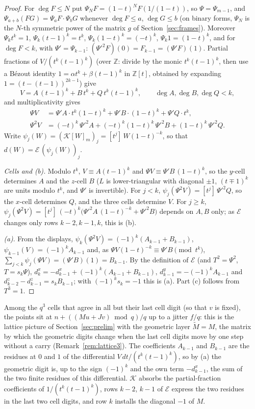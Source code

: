 \documentclass[11pt]{amsart}
\theoremstyle{definition}
\theoremstyle{plain}
\newcommand{\Z}{\mathbb{Z}}
\newcommand{\coef}[1]{[t^{#1}]\,}
\begin{document}
\begin{proof}
For $\deg F\le N$ put $\Psi_NF=(1-t)^NF(1/(1-t))$, so $\Psi=\Psi_{m-1}$, and $\Psi_{a+b}(FG)=\Psi_aF\cdot\Psi_bG$ whenever $\deg F\le a$, $\deg G\le b$ (on binary forms, $\Psi_N$ is the $N$-th symmetric power of the matrix $g$ of Section~\ref{sec:frames}). Moreover $\Psi_kt^k=1$, $\Psi_k(t-1)^k=t^k$, $\Psi_k(1-t)^k=(-t)^k$, $\Psi_k1=(1-t)^k$, and for $\deg F<k$, with $\Psi'=\Psi_{k-1}$: $(\Psi'^2F)(0)=F_{k-1}=(\Psi'F)(1)$. Partial fractions of $V/(t^k(t-1)^k)$ (over $\Z$: divide by the monic $t^k(t-1)^k$, then use a B\'ezout identity $1=\alpha t^k+\beta(t-1)^k$ in $\Z[t]$, obtained by expanding $1=(t-(t-1))^{2k-1}$) give
\[
V=A\,(t-1)^k+B\,t^k+Q\,t^k(t-1)^k,\qquad\deg A,\deg B,\deg Q<k,
\]
and multiplicativity gives
\begin{align*}
\Psi V&=\Psi'A\cdot t^k(1-t)^k+\Psi'B\cdot(1-t)^k+\Psi'Q\cdot t^k,\\
\Psi^2V&=(-t)^k\,\Psi'^2A+(-t)^k(1-t)^k\,\Psi'^2B+(1-t)^k\,\Psi'^2Q .
\end{align*}
Write $\psi_j(W)=(\mathcal K[W]_m)_j=\coef{j}W(1-t)^{-k}$, so that $d(W)=\mathcal E\,(\psi_j(W))_j$.

\emph{Cells and (b).} Modulo $t^k$, $V\equiv A(t-1)^k$ and $\Psi V\equiv\Psi'B\,(1-t)^k$, so the $y$-cell determines $A$ and the $z$-cell $B$ ($L$ is lower-triangular with diagonal $\pm1$, $(t\mp1)^k$ are units modulo $t^k$, and $\Psi'$ is invertible). For $j<k$, $\psi_j(\Psi^2V)=\coef{j}\Psi'^2Q$, so the $x$-cell determines $Q$, and the three cells determine $V$. For $j\ge k$, $\psi_j(\Psi^2V)=\coef{j}(-t)^k\bigl(\Psi'^2A\,(1-t)^{-k}+\Psi'^2B\bigr)$ depends on $A,B$ only; as $\mathcal E$ changes only rows $k-2,k-1,k$, this is (b).

\emph{(a).} From the displays, $\psi_k(\Psi^2V)=(-1)^k(A_{k-1}+B_{k-1})$, $\psi_{k-1}(V)=(-1)^kA_{k-1}$ and, as $\Psi V(1-t)^{-k}\equiv\Psi'B\pmod{t^k}$, $\sum_{j<k}\psi_j(\Psi V)=(\Psi'B)(1)=B_{k-1}$. By the definition of $\mathcal E$ (and $T^2=\Psi^2$, $T=s_k\Psi$), $d^x_k=-d^x_{k-1}+(-1)^k(A_{k-1}+B_{k-1})$, $d^y_{k-1}=-(-1)^kA_{k-1}$ and $d^z_{k-2}-d^z_{k-1}=s_kB_{k-1}$; with $(-1)^ks_k=-1$ this is (a). Part (c) follows from $T^3=1$.
\end{proof}

Among the $q^3$ cells that agree in all but their last cell digit (so that $v$ is fixed), the points sit at $n+((Mu+Jv)\bmod q)/q$ up to a jitter $f/q$: this is the lattice picture of Section~\ref{sec:prelim} with the geometric layer $\tilde M=M$, the matrix by which the geometric digits change when the last cell digits move by one step without a carry (Remark~\ref{rem:lattice3}). The coefficients $A_{k-1}$ and $B_{k-1}$ are the residues at $0$ and $1$ of the differential $V\,dt/(t^k(t-1)^k)$, so by (a) the geometric digit is, up to the sign $(-1)^k$ and the own term $-d^x_{k-1}$, the sum of the two finite residues of this differential. $\mathcal K$ absorbs the partial-fraction coefficients of $1/(t^k(t-1)^k)$, rows $k-2$, $k-1$ of $\mathcal E$ express the two residues in the last two cell digits, and row $k$ installs the diagonal $-1$ of $M$.
\end{document}
